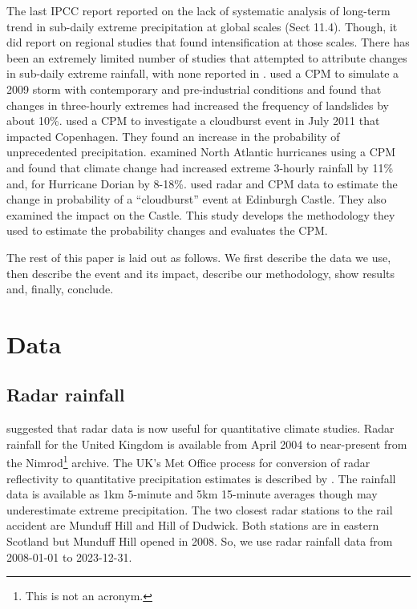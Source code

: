 \documentclass[11pt,a4paper]{article}
\begin{document}
The last IPCC report\parencite{Seneviratne2021ippcc_chapter_extremes} reported on the lack of systematic analysis of long-term trend in sub-daily extreme precipitation at global scales (Sect 11.4). Though, it did report on regional studies that found intensification at those scales.  There has  been an extremely limited number of studies that attempted to attribute changes in sub-daily extreme rainfall, with none reported in \cite{Seneviratne2021ippcc_chapter_extremes}.   \cite{mishra2023landslide}  used a  CPM to simulate a 2009 storm with contemporary and  pre-industrial conditions and found that changes in three-hourly extremes had increased the frequency of landslides by about 10\%. \cite{matte2022cloudburst}  used a CPM to investigate a cloudburst  event in July 2011 that impacted  Copenhagen. They found an increase in the probability of unprecedented precipitation.  \cite{Reed2022,Reed2021dorian_extreme_rain} examined North Atlantic hurricanes  using a CPM and found that climate change had increased extreme 3-hourly rainfall by 11\% and, for Hurricane Dorian by 8-18\%. \cite{tett2023edinburgh} used radar and CPM data to estimate the change in probability of a ``cloudburst'' event at Edinburgh Castle. They also examined the impact on the Castle.  This study develops the methodology they used to estimate the probability changes and evaluates the CPM. 

 
 
The rest of this paper is laid out as follows. We first describe the data we use,  then describe the event and its impact,  describe our methodology, show results and, finally,  conclude. 

\section{Data}
\label{sect:data}

\subsection{Radar rainfall}
\cite{saltikoff2019radar_climate} suggested that radar data is now useful for quantitative climate studies.  Radar rainfall for the United Kingdom is available from April 2004 to near-present\parencite{radar_data} from the Nimrod\footnote{This is not an acronym.} archive. The UK's Met Office process for conversion of radar reflectivity to quantitative precipitation estimates is described by \cite{harrison2000nimrod,Harrison2012,procedings:harrison15radarnet}. The rainfall data is available  as  1km 5-minute and 5km 15-minute  averages though may underestimate extreme precipitation\parencite{harrison2000nimrod}. The two closest radar stations to the rail accident are Munduff Hill and Hill of Dudwick. Both stations are in eastern Scotland but Munduff Hill opened in 2008. So,  we use radar rainfall  data from  2008-01-01 to 2023-12-31. 
\end{document}
